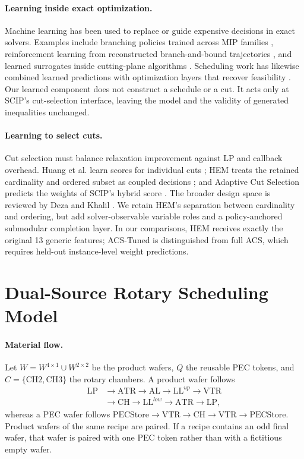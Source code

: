 \documentclass[letterpaper]{article}
\begin{document}
\paragraph{Learning inside exact optimization.}
Machine learning has been used to replace or guide expensive decisions in exact solvers.
Examples include branching policies trained across MIP families \cite{limip2023}, reinforcement learning from reconstructed branch-and-bound trajectories \cite{parsonson2023retro}, and learned surrogates inside cutting-plane algorithms \cite{mana2024cutting}.
Scheduling work has likewise combined learned predictions with optimization layers that recover feasibility \cite{kotary2022jsp}.
Our learned component does not construct a schedule or a cut.
It acts only at SCIP's cut-selection interface, leaving the model and the validity of generated inequalities unchanged.

\paragraph{Learning to select cuts.}
Cut selection must balance relaxation improvement against LP and callback overhead.
Huang et al. learn scores for individual cuts \cite{huang2022learning}; HEM treats the retained cardinality and ordered subset as coupled decisions \cite{wang2023hem}; and Adaptive Cut Selection predicts the weights of SCIP's hybrid score \cite{turner2023adaptive}.
The broader design space is reviewed by Deza and Khalil \cite{deza2023survey}.
We retain HEM's separation between cardinality and ordering, but add solver-observable variable roles and a policy-anchored submodular completion layer.
In our comparisons, HEM receives exactly the original 13 generic features; ACS-Tuned is distinguished from full ACS, which requires held-out instance-level weight predictions.

\section{Dual-Source Rotary Scheduling Model}

\paragraph{Material flow.}
Let $W=W^{4\times1}\cup W^{2\times2}$ be the product wafers, $Q$ the reusable PEC tokens, and $C=\{\mathrm{CH2},\mathrm{CH3}\}$ the rotary chambers.
A product wafer follows
\[
\begin{aligned}
\mathrm{LP}&\rightarrow\mathrm{ATR}\rightarrow\mathrm{AL}
\rightarrow\mathrm{LL}^{up}\rightarrow\mathrm{VTR}\\
&\rightarrow\mathrm{CH}\rightarrow\mathrm{LL}^{low}
\rightarrow\mathrm{ATR}\rightarrow\mathrm{LP},
\end{aligned}
\]
whereas a PEC wafer follows
$\mathrm{PECStore}\rightarrow\mathrm{VTR}\rightarrow\mathrm{CH}
\rightarrow\mathrm{VTR}\rightarrow\mathrm{PECStore}$.
Product wafers of the same recipe are paired.
If a recipe contains an odd final wafer, that wafer is paired with one PEC token rather than with a fictitious empty wafer.
\end{document}
